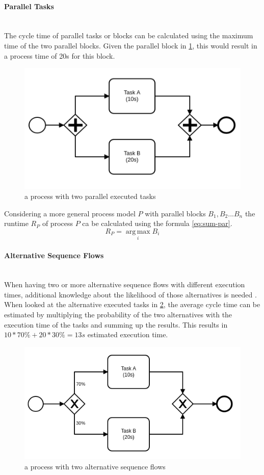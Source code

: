 \paragraph{Parallel Tasks}~\\
The cycle time of parallel tasks or blocks can be calculated using the maximum time of the two parallel blocks. Given the parallel block in \ref{fig:parallel-tasks}, this would result in a process time of 20s for this block.\cite{fundamentals}
\begin{figure}[H]
	\centering
	\includegraphics[width=0.5\columnwidth]{graphics/paralell-tasks}
	\caption{a process with two parallel executed tasks} 
	\label{fig:parallel-tasks} 
\end{figure}

Considering a more general process model $P$ with parallel blocks $B_1,B_2 ... B_n$ the runtime $R_P$ of process $P$ ca be calculated using the formula \ref{eq:sum-par}. 
\begin{equation}\label{eq:sum-par}
	R_P = \operatorname*{arg\,max}_i B_i
\end{equation}

\paragraph{Alternative Sequence Flows}~\\
When having two or more alternative sequence flows with different execution times, additional knowledge about the likelihood of those alternatives is needed \cite{fundamentals}. When looked at the alternative executed tasks in \ref{fig:alternative-tasks}, the average cycle time can be estimated by multiplying the probability of the two alternatives with the execution time of the tasks and summing up the results. This results in $10 * 70\% + 20 * 30\% = 13s$ estimated execution time. 

\begin{figure}[H]
	\centering
	\includegraphics[width=0.5\columnwidth]{graphics/alternative-tasks}
	\caption{a process with two alternative sequence flows} 
	\label{fig:alternative-tasks} 
\end{figure}

